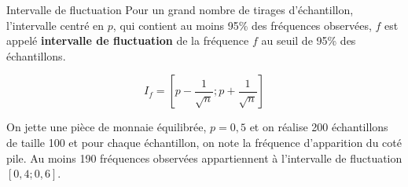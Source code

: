 \begin{DefT}{Intervalle de fluctuation}
Pour un grand nombre de tirages d'échantillon, l'intervalle centré en $p$, qui contient au moins
95\% des fréquences observées, $f$ est appelé \textbf{intervalle de fluctuation} de la fréquence $f$ au seuil de 95\%
des échantillons.

$$I_f=\left[ p - \frac{1}{\sqrt{n}}; p + \frac{1}{\sqrt{n}} \right]$$
\end{DefT}

\begin{Ex}
On jette une pièce de monnaie équilibrée, $p=0,5$ et on réalise 200 échantillons de taille 100 et pour chaque
échantillon, on note la fréquence d'apparition du coté pile.
Au moins 190 fréquences observées appartiennent à l'intervalle de fluctuation $[0,4 ; 0,6]$.
\end{Ex}




